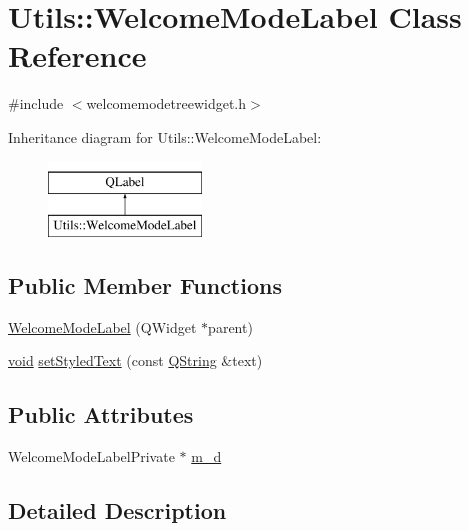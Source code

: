 \hypertarget{class_utils_1_1_welcome_mode_label}{\section{Utils\-:\-:Welcome\-Mode\-Label Class Reference}
\label{class_utils_1_1_welcome_mode_label}
}


{\ttfamily \#include $<$welcomemodetreewidget.\-h$>$}

Inheritance diagram for Utils\-:\-:Welcome\-Mode\-Label\-:\begin{figure}[H]
\begin{center}
\leavevmode
\includegraphics[height=2.000000cm]{class_utils_1_1_welcome_mode_label}
\end{center}
\end{figure}
\subsection*{Public Member Functions}
\begin{DoxyCompactItemize}
\item 
\hyperlink{class_utils_1_1_welcome_mode_label_ad83fa7150a17bc8b7079208d1ab21a31}{Welcome\-Mode\-Label} (Q\-Widget $\ast$parent)
\item 
\hyperlink{group___u_a_v_objects_plugin_ga444cf2ff3f0ecbe028adce838d373f5c}{void} \hyperlink{class_utils_1_1_welcome_mode_label_ab7bf52a3f03d9e057685edcf926150be}{set\-Styled\-Text} (const \hyperlink{group___u_a_v_objects_plugin_gab9d252f49c333c94a72f97ce3105a32d}{Q\-String} \&text)
\end{DoxyCompactItemize}
\subsection*{Public Attributes}
\begin{DoxyCompactItemize}
\item 
Welcome\-Mode\-Label\-Private $\ast$ \hyperlink{class_utils_1_1_welcome_mode_label_a1d69ec538fa784b0c5524d325a11f9a5}{m\-\_\-d}
\end{DoxyCompactItemize}


\subsection{Detailed Description}


